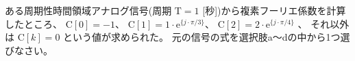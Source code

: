 ある周期性時間領域アナログ信号(周期 $\textrm{T} = 1$ [秒])から複素フーリエ係数を計算したところ、
$\textrm{C}[0] = -1$、
$\textrm{C}[1] = 1 \cdot \textrm{e}^{\{ j \cdot \pi/3 \}}$、
$\textrm{C}[2] = 2 \cdot \textrm{e}^{\{ j \cdot \pi/4 \}}$ 、
それ以外は $\textrm{C}[k] = 0$ という値が求められた。
元の信号の式を選択肢a〜dの中から1つ選びなさい。
